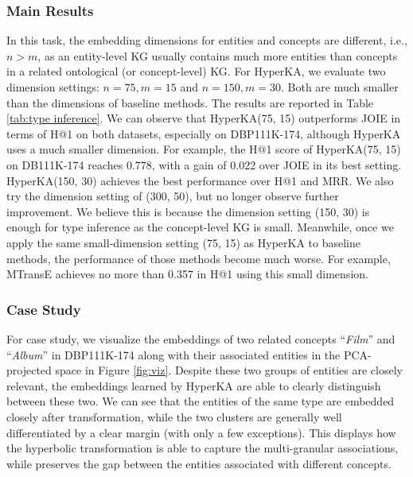 \documentclass[11pt,a4paper]{article}
\newcommand{\modelname}{HyperKA\xspace}
\begin{document}
\subsubsection{Main Results}
In this task, the embedding dimensions for entities and concepts are different, i.e., $n>m$, as an entity-level KG usually contains much more entities than concepts in a related ontological (or concept-level) KG. For \modelname, we evaluate two dimension settings: $n=75, m=15$ and $n=150, m=30$. Both are much smaller than the dimensions of baseline methods. The results are reported in Table \ref{tab:type inference}. We can observe that \modelname (75, 15) outperforms JOIE in terms of H@1 on both datasets, especially on DBP111K-174, although \modelname uses a much smaller dimension. For example, the H@1 score of \modelname (75, 15) on DB111K-174 reaches 0.778, with a gain of 0.022 over JOIE in its best setting. \modelname (150, 30) achieves the best performance over H@1 and MRR. We also try the dimension setting of (300, 50), but no longer observe further improvement. We believe this is because the dimension setting (150, 30) is enough for type inference as the concept-level KG is small. Meanwhile, once we apply the same small-dimension setting (75, 15) as \modelname to baseline methods, the performance of those methods become much worse. For example, MTransE achieves no more than 0.357 in H@1 using this small dimension.

\subsubsection{Case Study}
\label{appendix:viz}
For case study, we visualize the embeddings of two related concepts ``\textit{Film}'' and ``\textit{Album}'' in DBP111K-174 along with their associated entities in the PCA-projected space in Figure \ref{fig:viz}. Despite these two groups of entities are closely relevant, the embeddings learned by \modelname are able to clearly distinguish between these two. We can see that the entities of the same type are embedded closely after transformation, while the two clusters are generally well differentiated by a clear margin (with only a few exceptions). This displays how the hyperbolic transformation is able to capture the multi-granular associations, while preserves the gap between the entities associated with different concepts.
\end{document}
